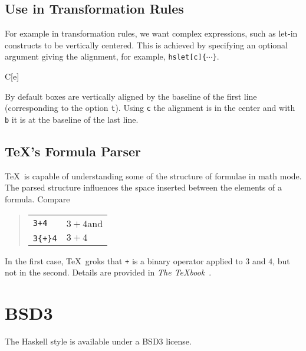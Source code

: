 \documentclass[a4paper]{article}
\newcommand{\cmd}[1]{\texttt{\backslashchar#1}}
\begin{document}
\subsection{Use in Transformation Rules}

For example in transformation rules, we want complex expressions, such as
let-in constructs to be vertically centered.  This is achieved by specifying
an optional argument giving the alignment, for example,
\cmd{hslet[c]\{$\cdots$\}}. 
%
\begin{haskell}
  \Longrightarrow
  C[e]
\end{haskell}
%
By default boxes are vertically aligned by the baseline of the first line
(corresponding to the option \texttt{t}).  Using \texttt{c} the alignment is
in the center and with \texttt{b} it is at the baseline of the last line.

\subsection{\TeX's Formula Parser}

\TeX\ is capable of understanding some of the structure of formulae in math
mode.  The parsed structure influences the space inserted between the elements 
of a formula.  Compare 
%
\begin{quote}
  \begin{tabular}{l@{~$\Longrightarrow$~}l}
    \texttt{3+4}     & \(3+4\)\quad and\\
    \texttt{3\{+\}4} & \(3{+}4\)
  \end{tabular}
\end{quote}
%
In the first case, \TeX\ groks that \texttt{+} is a binary operator applied to
$3$ and $4$, but not in the second.  Details are provided in \emph{The
  \TeX{}book}~\cite{knuth:tex}.





\section{BSD3}

The Haskell style is available under a BSD3 license.



\end{document}
